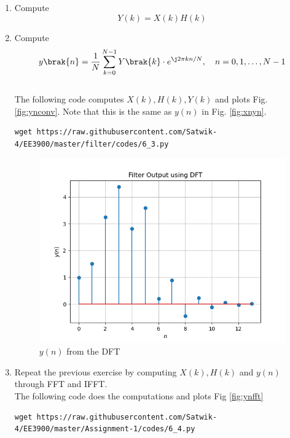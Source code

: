 \documentclass[journal,12pt,twocolumn]{IEEEtran}
\renewcommand\thesection{\arabic{section}}
\begin{document}
\begin{enumerate}[label=\thesection.\arabic*]
\item Compute 
\begin{equation}
Y(k) = X(k)H(k)
\end{equation}
\item Compute
\begin{equation}
 y\brak{n}={\frac {1}{N}}\sum _{k=0}^{N-1}Y\brak{k}\cdot e^{\j 2\pi kn/N},\quad n = 0,1,\dots, N-1
\end{equation}
\\
\solution The following code computes $X(k), H(k), Y(k)$ and plots Fig. \ref{fig:ynconv}. Note that this is the same as 
$y(n)$ in  Fig. 
\ref{fig:xnyn}. 
%
\begin{lstlisting}
wget https://raw.githubusercontent.com/Satwik-4/EE3900/master/filter/codes/6_3.py
\end{lstlisting}
\begin{figure}[!ht]
\centering
\includegraphics[width=\columnwidth]{./figures/Figure_6}
\caption{$y(n)$ from the DFT}
\label{fig:yndft}
\end{figure}
\item Repeat the previous exercise by computing $X(k), H(k)$ and $y(n)$ through FFT and 
IFFT.\\
\solution The following code does the computations and plots Fig \ref{fig:ynfft}
\begin{lstlisting}
wget https://raw.githubusercontent.com/Satwik-4/EE3900/master/Assignment-1/codes/6_4.py
\end{lstlisting}
\begin{figure}[!ht]
\centering

\end{figure}
\end{enumerate}
\end{document}
